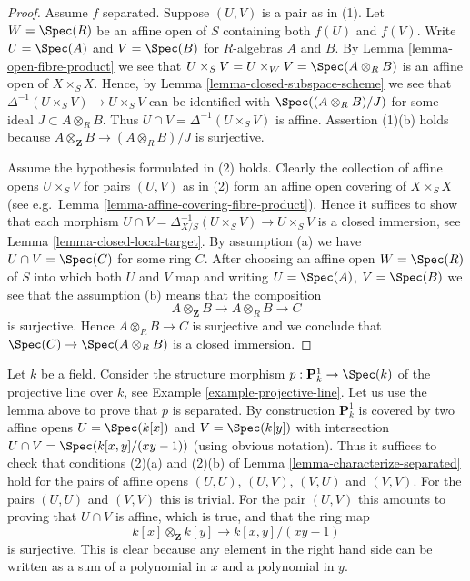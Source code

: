 \begin{proof}
Assume $f$ separated. Suppose $(U, V)$ is a pair as in (1).
Let $W = \Spec(R)$ be an affine open of $S$ containing
both $f(U)$ and $f(V)$. Write $U = \Spec(A)$ and
$V = \Spec(B)$ for $R$-algebras $A$ and $B$.
By Lemma \ref{lemma-open-fibre-product} we see that
$U \times_S V = U \times_W V = \Spec(A \otimes_R B)$
is an affine open of $X \times_S X$. Hence, by
Lemma \ref{lemma-closed-subspace-scheme} we see that
$\Delta^{-1}(U \times_S V) \to U \times_S V$
can be identified with $\Spec((A \otimes_R B)/J)$
for some ideal $J \subset A \otimes_R B$.
Thus $U \cap V = \Delta^{-1}(U \times_S V)$ is affine.
Assertion (1)(b) holds because
$A \otimes_{\mathbf{Z}} B \to (A \otimes_R B)/J$ is surjective.

\medskip\noindent
Assume the hypothesis formulated in (2) holds.
Clearly the collection of affine opens $U \times_S V$
for pairs $(U, V)$ as in (2) form an affine open covering
of $X \times_S X$ (see e.g.\ Lemma \ref{lemma-affine-covering-fibre-product}).
Hence it suffices to show that each morphism
$U \cap V = \Delta_{X/S}^{-1}(U \times_S V) \to U \times_S V$
is a closed immersion, see Lemma \ref{lemma-closed-local-target}.
By assumption (a) we have $U \cap V = \Spec(C)$ for some ring $C$.
After choosing an affine open $W = \Spec(R)$ of $S$
into which both $U$ and $V$ map and writing $U = \Spec(A)$,
$V = \Spec(B)$ we see that the assumption (b) means
that the composition
$$
A \otimes_{\mathbf{Z}} B \to A \otimes_R B \to C
$$
is surjective. Hence $A \otimes_R B \to C$ is surjective and
we conclude that $\Spec(C) \to \Spec(A \otimes_R B)$
is a closed immersion.
\end{proof}

\begin{example}
\label{example-projective-line-separated}
Let $k$ be a field. Consider the structure morphism
$p : \mathbf{P}^1_k \to \Spec(k)$ of the projective
line over $k$, see Example \ref{example-projective-line}.
Let us use the lemma above to prove that $p$
is separated. By construction $\mathbf{P}^1_k$ is covered by two
affine opens $U = \Spec(k[x])$ and $V = \Spec(k[y])$
with intersection $U \cap V = \Spec(k[x, y]/(xy - 1))$
(using obvious notation). Thus it suffices to check that
conditions (2)(a) and (2)(b) of Lemma \ref{lemma-characterize-separated}
hold for the pairs of affine opens $(U, U)$, $(U, V)$, $(V, U)$
and $(V, V)$. For the pairs $(U, U)$ and $(V, V)$ this is trivial.
For the pair $(U, V)$ this amounts to proving
that $U \cap V$ is affine, which is true, and that the ring map
$$
k[x] \otimes_{\mathbf{Z}} k[y] \longrightarrow k[x, y]/(xy - 1)
$$
is surjective. This is clear because any element in the
right hand side can be written as a sum of a polynomial
in $x$ and a polynomial in $y$.
\end{example}

